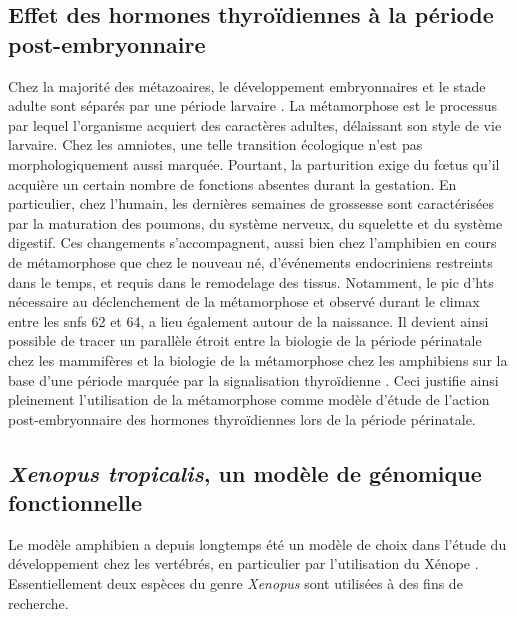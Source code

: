 \documentclass[../main.tex]{subfiles}
\begin{document}

	\subsection{Effet des hormones thyroïdiennes à la période post-embryonnaire}
		Chez la majorité des métazoaires, le développement embryonnaires et le stade adulte sont séparés par une période larvaire \citep{Laudet2011b,Holstein2014}.
		La métamorphose est le processus par lequel l'organisme acquiert des caractères adultes, délaissant son style de vie larvaire.
		Chez les amniotes, une telle transition écologique n'est pas morphologiquement aussi marquée.
		Pourtant, la parturition exige du fœtus qu'il acquière un certain nombre de fonctions absentes durant la gestation.
		En particulier, chez l'humain, les dernières semaines de grossesse sont caractérisées par la maturation des poumons, du système nerveux, du squelette et du système digestif.
		Ces changements s'accompagnent, aussi bien chez l'amphibien en cours de métamorphose que chez le nouveau né, d'événements endocriniens restreints dans le temps, et requis dans le remodelage des tissus.
		Notamment, le pic d'\glspl{ht} nécessaire au déclenchement de la métamorphose et observé durant le climax entre les \glspl{snf} 62 et 64, a lieu également autour de la naissance.
		Il devient ainsi possible de tracer un parallèle étroit entre la biologie de la période périnatale chez les mammifères et la biologie de la métamorphose chez les amphibiens sur la base d'une période marquée par la signalisation thyroïdienne \citep{Laudet2011b}.
		Ceci justifie ainsi pleinement l'utilisation de la métamorphose comme modèle d'étude de l'action post-embryonnaire des hormones thyroïdiennes lors de la période périnatale. 


	\subsection{\textit{Xenopus tropicalis}, un modèle de génomique fonctionnelle}\label{subsec:xtrop-model}
		Le modèle amphibien a depuis longtemps été un modèle de choix dans l'étude du développement chez les vertébrés, en particulier par l'utilisation du Xénope \citep{Harland2011}.
		Essentiellement deux espèces du genre \textit{Xenopus} sont utilisées à des fins de recherche.
\end{document}
